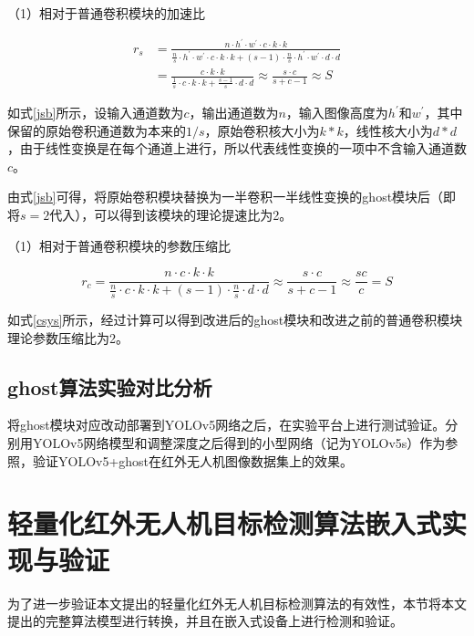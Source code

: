 （1）相对于普通卷积模块的加速比

\begin{equation}
    \begin{aligned}
    r_{s} &=\frac{n \cdot h^{\prime} \cdot w^{\prime} \cdot c \cdot k \cdot k}{\frac{n}{s} \cdot h^{\prime} \cdot w^{\prime} \cdot c \cdot k \cdot k+(s-1) \cdot \frac{n}{s} \cdot h^{\prime} \cdot w^{\prime} \cdot d \cdot d} \\
    &=\frac{c \cdot k \cdot k}{\frac{1}{s} \cdot c \cdot k \cdot k+\frac{s-1}{s} \cdot d \cdot d} \approx \frac{s \cdot c}{s+c-1} \approx S
    \end{aligned}
    \label{jsb}
\end{equation}

如式\ref{jsb}所示，设输入通道数为$c$，输出通道数为$n$，输入图像高度为$h^{\prime}$和$w^{\prime}$，其中保留的原始卷积通道数为本来的$1/s$，原始卷积核大小为$k*k$，线性核大小为$d*d$，由于线性变换是在每个通道上进行，所以代表线性变换的一项中不含输入通道数$c$。

由式\ref{jsb}可得，将原始卷积模块替换为一半卷积一半线性变换的ghost模块后（即将$s=2$代入），可以得到该模块的理论提速比为2。

（1）相对于普通卷积模块的参数压缩比

\begin{equation}
    r_{c}=\frac{n \cdot c \cdot k \cdot k}{\frac{n}{s} \cdot c \cdot k \cdot k+(s-1) \cdot \frac{n}{s} \cdot d \cdot d} \approx \frac{s \cdot c}{s+c-1} \approx \frac{s c}{c}=S
    \label{csys}
\end{equation}

如式\ref{csys}所示，经过计算可以得到改进后的ghost模块和改进之前的普通卷积模块理论参数压缩比为2。

\subsection{ghost算法实验对比分析}
将ghost模块对应改动部署到YOLOv5网络之后，在实验平台上进行测试验证。分别用YOLOv5网络模型和调整深度之后得到的小型网络（记为YOLOv5s）作为参照，验证YOLOv5+ghost在红外无人机图像数据集上的效果。

\section{轻量化红外无人机目标检测算法嵌入式实现与验证}
为了进一步验证本文提出的轻量化红外无人机目标检测算法的有效性，本节将本文提出的完整算法模型进行转换，并且在嵌入式设备上进行检测和验证。

